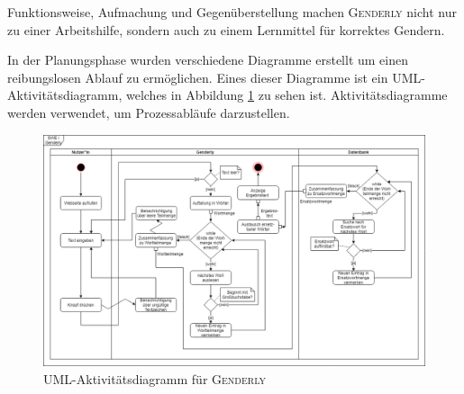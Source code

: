\documentclass[paper=a4, parskip=half]{scrreprt}
\newcommand{\Genderly}{\textsc{Genderly }}
\begin{document}
Funktionsweise, Aufmachung und Gegenüberstellung machen \Genderly nicht nur zu einer Arbeitshilfe, sondern auch zu einem Lernmittel für korrektes Gendern.

In der Planungsphase wurden verschiedene Diagramme erstellt um einen reibungslosen Ablauf zu ermöglichen. Eines dieser Diagramme ist ein UML-Aktivitätsdiagramm, welches in Abbildung \ref{fig:Aktivitaetsdiagramm} zu sehen ist. Aktivitätsdiagramme werden verwendet, um Prozessabläufe darzustellen.

\begin{figure}[hbt!]
  \centering
  \includegraphics[scale=0.35]{Bilder/Aktivitaetsdiagramm.png}
  \vspace{-0.25cm}
  \caption[UML-Aktivitätsdiagramm für Genderly]{UML-Aktivitätsdiagramm für \Genderly}
  \label{fig:Aktivitaetsdiagramm}
\end{figure}
\end{document}
